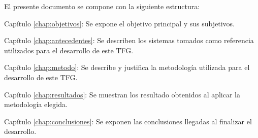 El presente documento se compone con la siguiente estructura:

\begin{definitionlist}
\item[Capítulo \ref{chap:objetivos}: \nameref{chap:objetivos}] Se expone el objetivo principal y sus subjetivos.
 \item[Capítulo \ref{chap:antecedentes}: \nameref{chap:antecedentes}] Se describen los sistemas tomados como referencia utilizados para 
 el desarrollo de este \acs{TFG}.
  \item [Capítulo \ref{chap:metodo}: \nameref{chap:metodo}] Se describe y justifica la metodología utilizada para el desarrollo de este \acs{TFG}.
  \item[Capítulo \ref{chap:resultados}: \nameref{chap:resultados}] Se muestran los resultado obtenidos al aplicar la metodología elegida.
  \item[Capítulo \ref{chap:conclusiones}: \nameref{chap:conclusiones}] Se exponen las conclusiones llegadas al finalizar el desarrollo.
\end{definitionlist}

